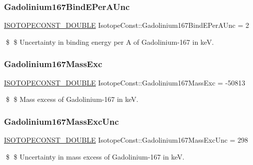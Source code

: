 \subsubsection{\texorpdfstring{Gadolinium167\+Bind\+E\+Per\+A\+Unc}{Gadolinium167BindEPerAUnc}}
{\footnotesize\ttfamily \mbox{\hyperlink{group___isotope_const-_macros_ga8f45a7272ce02c0b4c65c44636ed719a}{I\+S\+O\+T\+O\+P\+E\+C\+O\+N\+S\+T\+\_\+\+D\+O\+U\+B\+LE}} Isotope\+Const\+::\+Gadolinium167\+Bind\+E\+Per\+A\+Unc = 2}

\$ \$ Uncertainty in binding energy per A of Gadolinium-\/167 in keV. \mbox{\label{group___isotope_const-_gadolinium-_gd167_gad25796d7a7152642cfdb6e6b78e253be}} 
\subsubsection{\texorpdfstring{Gadolinium167\+Mass\+Exc}{Gadolinium167MassExc}}
{\footnotesize\ttfamily \mbox{\hyperlink{group___isotope_const-_macros_ga8f45a7272ce02c0b4c65c44636ed719a}{I\+S\+O\+T\+O\+P\+E\+C\+O\+N\+S\+T\+\_\+\+D\+O\+U\+B\+LE}} Isotope\+Const\+::\+Gadolinium167\+Mass\+Exc = -\/50813}

\$ \$ Mass excess of Gadolinium-\/167 in keV. \mbox{\label{group___isotope_const-_gadolinium-_gd167_ga1fbe6e864d243f71addb985803371a71}} 
\subsubsection{\texorpdfstring{Gadolinium167\+Mass\+Exc\+Unc}{Gadolinium167MassExcUnc}}
{\footnotesize\ttfamily \mbox{\hyperlink{group___isotope_const-_macros_ga8f45a7272ce02c0b4c65c44636ed719a}{I\+S\+O\+T\+O\+P\+E\+C\+O\+N\+S\+T\+\_\+\+D\+O\+U\+B\+LE}} Isotope\+Const\+::\+Gadolinium167\+Mass\+Exc\+Unc = 298}

\$ \$ Uncertainty in mass excess of Gadolinium-\/167 in keV. \mbox{\label{group___isotope_const-_gadolinium-_gd167_gaa67dc3ba9465c7875e6dcbb3d844d507}} 
